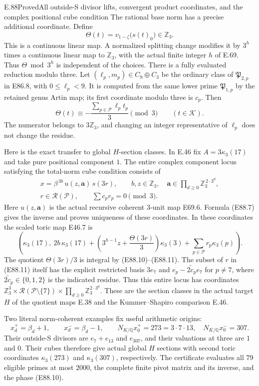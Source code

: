 \begin{statement}{E.88}{Proved}{All outside-S divisor lifts, convergent product coordinates, and the complex positional cube condition}
The rational base norm has a precise additional
coordinate. Define
\[
 \Theta(t)=v_{1-\zeta}\bigl(s(t)_0\bigr)\in\mathbb Z_3 .
 \tag{E88.9}
\]
This is a continuous linear map. A normalized
splitting change modifies it by $3^h$ times a
continuous linear map to $\mathbb Z_3$, with the
actual finite integer $h$ of E.69. Thus
$\Theta\bmod3^h$ is independent of the choices.
There is a fully evaluated reduction modulo three.
Let $(\ell_p,m_p)\in C_9\oplus C_3$ be the
ordinary class of $\mathfrak P_{2,p}$ in E86.8,
with $0\le\ell_p<9$. It is computed from the
same lower prime $\mathfrak P_{1,p}$ by the
retained genus Artin map; its first coordinate
modulo three is $c_p$. Then
\[
 \Theta(t)\equiv
       -\frac{\sum_{p\in\mathcal P}\ell_p t_p}{3}
          \pmod3\qquad(t\in\mathcal K).
 \tag{E88.10}
\]
The numerator belongs to $3\mathbb Z_3$, and
changing an integer representative of $\ell_p$
does not change the residue.

Here is the exact transfer to global $H$-section
classes. In E.46 fix $A=3\kappa_3(17)$ and take
pure positional component $1$. The entire complex
component locus satisfying the total-norm cube
condition consists of
\[
 \begin{gathered}
 x=\beta^{\,3b}\,u(z,\mathbf a)\,s(3r),\qquad
 b,z\in\mathbb Z_3,\quad
 \mathbf a\in\prod_{d\ge0}\mathbb Z_3^{\,2\cdot3^d},\\
 r\in\mathscr R(\mathcal P),\qquad
                         \sum c_pr_p=0\pmod3 .
 \end{gathered}
 \tag{E88.11}
\]
Here $u(z,\mathbf a)$ is the actual recursive
coherent $3$-unit map E69.6. Formula (E88.7)
gives the inverse and proves uniqueness of these
coordinates. In these coordinates the scaled
toric map E46.7 is
\[
 \left(
 \kappa_3(17),\
 2b\,\kappa_3(17)
 +\left(3^{h-1}z+\frac{\Theta(3r)}3\right)\kappa_3(3)
 +\sum_{p\in\mathcal P}r_p\kappa_3(p)
 \right).
 \tag{E88.12}
\]
The quotient $\Theta(3r)/3$ is integral by
(E88.10)--(E88.11). The subset of $r$ in
(E88.11) itself has the explicit restricted
basis
$3e_7$ and $e_p-\widetilde{2c_p}e_7$ for
$p\ne7$, where $\widetilde{2c_p}\in\{0,1,2\}$
is the indicated residue. Thus this entire
locus has coordinates
$\mathbb Z_3^3\times\mathscr R(\mathcal P\setminus\{7\})
\times\prod_{d\ge0}\mathbb Z_3^{2\cdot3^d}$.
These are the section classes in the actual
target $H$ of the quotient maps E.38 and
the Kummer--Shapiro comparison E.46.

Two literal norm-coherent examples fix useful
arithmetic origins:
\[
 x_d^+=\beta_d+1,\qquad x_d^-=\beta_d-1,\qquad
 N_{K/\mathbb Q}x_0^+=273=3\cdot7\cdot13,\quad
 N_{K/\mathbb Q}x_0^-=307.
 \tag{E88.13}
\]
Their outside-S divisors are $e_7+e_{13}$ and
$e_{307}$, and their valuations at three are
$1$ and $0$. Their cubes therefore give actual
global $H$ sections with second toric coordinates
$\kappa_3(273)$ and $\kappa_3(307)$, respectively.
The certificate evaluates all $79$ eligible
primes at most $2000$, the complete finite pivot
matrix and its inverse, and the phase (E88.10).


\end{statement}
